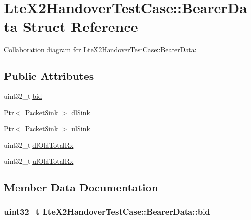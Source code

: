 \hypertarget{structLteX2HandoverTestCase_1_1BearerData}{}\section{Lte\+X2\+Handover\+Test\+Case\+:\+:Bearer\+Data Struct Reference}
\label{structLteX2HandoverTestCase_1_1BearerData}


Collaboration diagram for Lte\+X2\+Handover\+Test\+Case\+:\+:Bearer\+Data\+:
\subsection*{Public Attributes}
\begin{DoxyCompactItemize}
\item 
uint32\+\_\+t \hyperlink{structLteX2HandoverTestCase_1_1BearerData_a87bc6f179d81737f3ff6a453026f3607}{bid}
\item 
\hyperlink{classns3_1_1Ptr}{Ptr}$<$ \hyperlink{classns3_1_1PacketSink}{Packet\+Sink} $>$ \hyperlink{structLteX2HandoverTestCase_1_1BearerData_aaf75fc77bed46bb7bec16abde9b38c19}{dl\+Sink}
\item 
\hyperlink{classns3_1_1Ptr}{Ptr}$<$ \hyperlink{classns3_1_1PacketSink}{Packet\+Sink} $>$ \hyperlink{structLteX2HandoverTestCase_1_1BearerData_ae3811c336998dfdc65157a4154e9fa9d}{ul\+Sink}
\item 
uint32\+\_\+t \hyperlink{structLteX2HandoverTestCase_1_1BearerData_a35d5d2212465c43653837086aca5ef2f}{dl\+Old\+Total\+Rx}
\item 
uint32\+\_\+t \hyperlink{structLteX2HandoverTestCase_1_1BearerData_aae69151d8c855305994e68f3b2b7d244}{ul\+Old\+Total\+Rx}
\end{DoxyCompactItemize}


\subsection{Member Data Documentation}
\subsubsection[{\texorpdfstring{bid}{bid}}]{\setlength{\rightskip}{0pt plus 5cm}uint32\+\_\+t Lte\+X2\+Handover\+Test\+Case\+::\+Bearer\+Data\+::bid}\hypertarget{structLteX2HandoverTestCase_1_1BearerData_a87bc6f179d81737f3ff6a453026f3607}{}\label{structLteX2HandoverTestCase_1_1BearerData_a87bc6f179d81737f3ff6a453026f3607}
